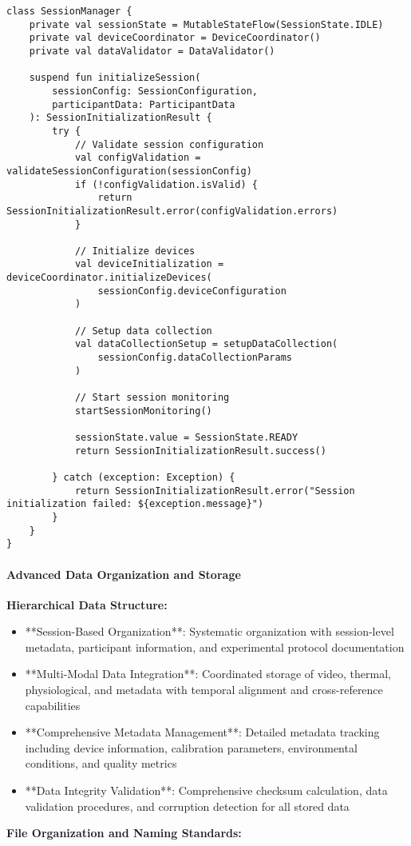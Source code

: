 \documentclass[11pt,a4paper]{report}
\begin{document}
\begin{verbatim}
class SessionManager {
    private val sessionState = MutableStateFlow(SessionState.IDLE)
    private val deviceCoordinator = DeviceCoordinator()
    private val dataValidator = DataValidator()

    suspend fun initializeSession(
        sessionConfig: SessionConfiguration,
        participantData: ParticipantData
    ): SessionInitializationResult {
        try {
            // Validate session configuration
            val configValidation = validateSessionConfiguration(sessionConfig)
            if (!configValidation.isValid) {
                return SessionInitializationResult.error(configValidation.errors)
            }

            // Initialize devices
            val deviceInitialization = deviceCoordinator.initializeDevices(
                sessionConfig.deviceConfiguration
            )

            // Setup data collection
            val dataCollectionSetup = setupDataCollection(
                sessionConfig.dataCollectionParams
            )

            // Start session monitoring
            startSessionMonitoring()

            sessionState.value = SessionState.READY
            return SessionInitializationResult.success()

        } catch (exception: Exception) {
            return SessionInitializationResult.error("Session initialization failed: ${exception.message}")
        }
    }
}
\end{verbatim}

\paragraph{Advanced Data Organization and Storage}

\textbf{Hierarchical Data Structure:}

\begin{itemize}
\item **Session-Based Organization**: Systematic organization with session-level metadata, participant information, and
  experimental protocol documentation
\item **Multi-Modal Data Integration**: Coordinated storage of video, thermal, physiological, and metadata with temporal
  alignment and cross-reference capabilities
\item **Comprehensive Metadata Management**: Detailed metadata tracking including device information, calibration
  parameters, environmental conditions, and quality metrics
\item **Data Integrity Validation**: Comprehensive checksum calculation, data validation procedures, and corruption
  detection for all stored data

\end{itemize}
\textbf{File Organization and Naming Standards:}
\end{document}
